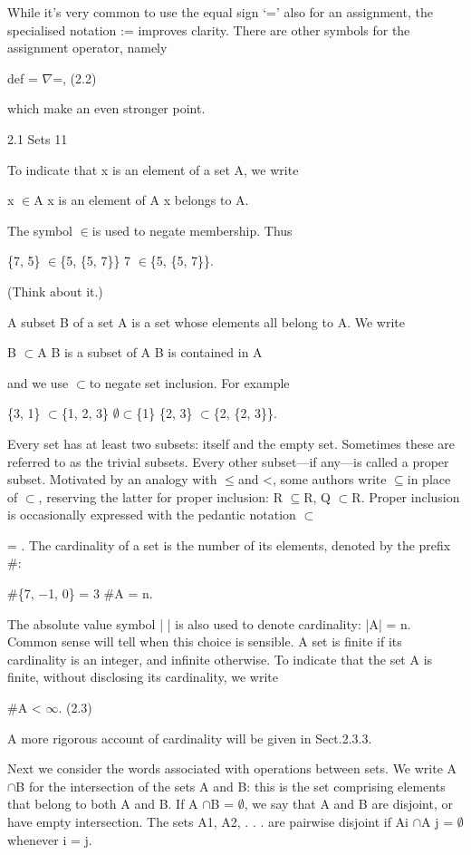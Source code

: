\documentclass[11pt]{article}
\theoremstyle{plain}
\theoremstyle{definition}
\begin{document}
While it's very common to use the equal sign `=' also for an assignment, the specialised notation := improves clarity. There are other symbols for the assignment operator, namely

def = $\nabla$=, (2.2)

which make an even stronger point.

2.1 Sets 11

To indicate that x is an element of a set A, we write

x $\in$A x is an element of A x belongs to A.

The symbol $\in$is used to negate membership. Thus

\{7, 5\} $\in$\{5, \{5, 7\}\} 7 $\in$\{5, \{5, 7\}\}.

(Think about it.)

A subset B of a set A is a set whose elements all belong to A. We write

B $\subset$A B is a subset of A B is contained in A

and we use $\subset$to negate set inclusion. For example

\{3, 1\} $\subset$\{1, 2, 3\} $\emptyset$$\subset$\{1\} \{2, 3\} $\subset$\{2, \{2, 3\}\}.

Every set has at least two subsets: itself and the empty set. Sometimes these are referred to as the trivial subsets. Every other subset---if any---is called a proper subset. Motivated by an analogy with $\leq$and <, some authors write $\subseteq$in place of $\subset$, reserving the latter for proper inclusion: R $\subseteq$R, Q $\subset$R. Proper inclusion is occasionally expressed with the pedantic notation $\subset$

= . The cardinality of a set is the number of its elements, denoted by the prefix \#:

\#\{7, $-$1, 0\} = 3 \#A = n.

The absolute value symbol | \textperiodcentered{} | is also used to denote cardinality: |A| = n. Common sense will tell when this choice is sensible. A set is finite if its cardinality is an integer, and infinite otherwise. To indicate that the set A is finite, without disclosing its cardinality, we write

\#A < $\infty$. (2.3)

A more rigorous account of cardinality will be given in Sect.2.3.3.

Next we consider the words associated with operations between sets. We write A $\cap$B for the intersection of the sets A and B: this is the set comprising elements that belong to both A and B. If A $\cap$B = $\emptyset$, we say that A and B are disjoint, or have empty intersection. The sets A1, A2, . . . are pairwise disjoint if Ai $\cap$A j = $\emptyset$ whenever i = j.
\end{document}
